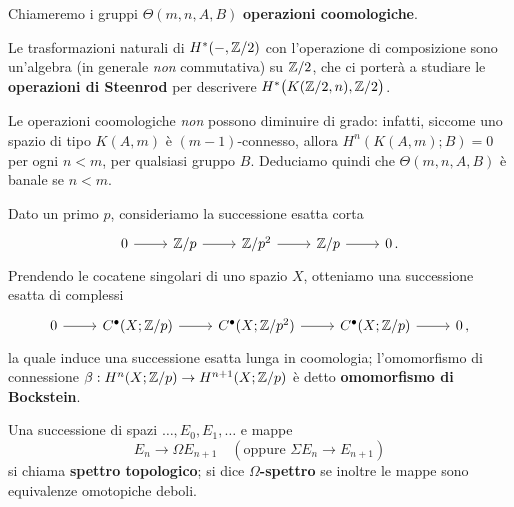 \begin{df}
	Chiameremo i gruppi $\Theta(m,n,A,B)$ \textbf{operazioni coomologiche}.
\end{df}



\begin{ex}
Le trasformazioni naturali di $H^{*}(-,{\mathbb Z}/2)$
con l'operazione di composizione sono un'algebra 
(in generale \emph{non} commutativa) su ${\mathbb Z}/2$,
che ci porterà a studiare le \textbf{operazioni di Steenrod}
per descrivere $H^{*}\big( K({\mathbb Z}/2,n),{\mathbb Z}/2 \big)$.
\end{ex}

\begin{oss}
	Le operazioni coomologiche \emph{non} possono diminuire di grado:
	infatti, siccome uno spazio di tipo $K(A,m)$ è $(m-1)$-connesso,
	allora $H^{n}(K(A,m);B)=0$ per ogni $n < m$, per qualsiasi gruppo $B$.
	Deduciamo quindi che $\Theta(m,n,A,B)$ è banale se $n<m$.
\end{oss}

\begin{ex}
	Dato un primo $p$, consideriamo la successione esatta corta
	\begin{equation*}
		\begin{tikzcd}
			0 \ar[r]
			& \Z/p \ar[r]
			& \Z/p^{2} \ar[r]
			& \Z/p \ar[r]
			& 0\,.
		\end{tikzcd}
	\end{equation*}
	Prendendo le cocatene singolari di uno spazio $X$,
	otteniamo una successione esatta di complessi
	\begin{equation*}
		\begin{tikzcd}
			0 \ar[r]
			& C^{\bullet}(X;\Z/p) \ar[r]
			& C^{\bullet}(X;\Z/p^{2}) \ar[r]
			& C^{\bullet}(X;\Z/p) \ar[r]
			& 0\,,
		\end{tikzcd}
	\end{equation*}
	la quale induce una successione esatta lunga in coomologia;
	l'omomorfismo di connessione $\beta:H^{n}(X;{\mathbb Z}/p) \to H^{n+1}(X;{\mathbb Z}/p)$
	è detto \textbf{omomorfismo di Bockstein}.
\end{ex}


\begin{df}
	Una successione di spazi $\dots, E_{0}, E_{1}, \dots$ e mappe
	\begin{equation*}
		E_{n} \longrightarrow \Omega E_{n+1}
		\quad (\text{oppure } \Sigma E_{n} \longrightarrow E_{n+1})
	\end{equation*}
	si chiama \textbf{spettro topologico};
	si dice \textbf{$\Omega$-spettro} se inoltre le mappe sono equivalenze omotopiche deboli.
\end{df}

